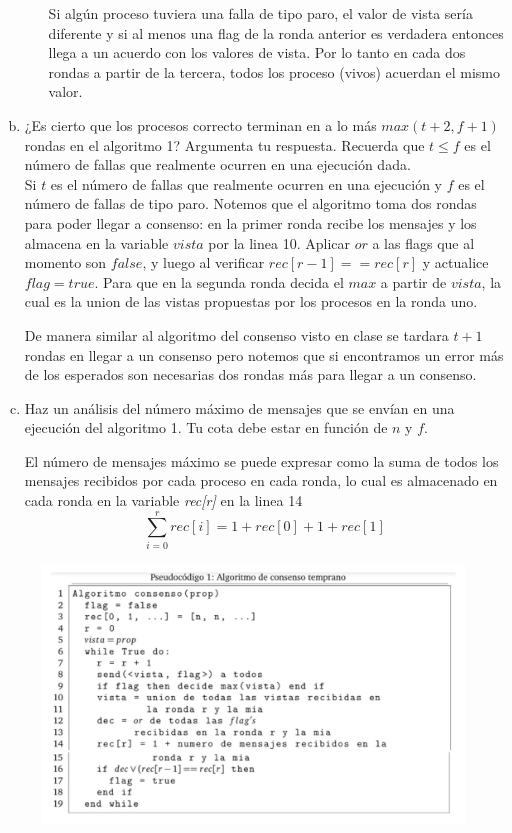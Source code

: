\begin{enumerate}[a)]
\begin{itemize}
        Si algún proceso tuviera una falla de tipo paro, el valor de vista sería
        diferente y si al menos una flag de la ronda anterior es verdadera entonces
        llega a un acuerdo con los valores de vista. Por lo tanto en cada dos
        rondas a partir de la tercera, todos los proceso (vivos) acuerdan el mismo valor.
    \end{itemize}


    \item ¿Es cierto que los procesos correcto terminan en a lo más
    $max(t +2, f +1)$ rondas en el algoritmo 1? Argumenta tu respuesta.
    Recuerda que $t \leq f$ es el número de fallas que realmente ocurren en una
    ejecución dada.\\
    Si $t$ es el número de fallas que realmente ocurren en una ejecución y $f$ es el número de fallas de tipo paro.
    Notemos que el algoritmo toma dos rondas para poder llegar a consenso: en la primer ronda recibe los mensajes y los almacena en la variable $vista$ por la linea 10. Aplicar $or$ a las flags que al momento son $false$, y luego al verificar $rec[r-1]==rec[r]$ y actualice $flag=true$. Para que en la segunda ronda decida el $max$ a partir de $vista$, la cual es la union de las vistas propuestas por los procesos en la ronda uno. 
    
    De manera similar al algoritmo del consenso visto en clase se tardara $t+1$ rondas en llegar a un consenso pero notemos que si encontramos un error más de los esperados son necesarias dos rondas más para llegar a un consenso.

    \item Haz un análisis del número máximo de mensajes que se envían en una
    ejecución del algoritmo 1. Tu cota debe estar en función de $n$ y $f$.

    El número de mensajes máximo se puede expresar como la suma de todos los mensajes recibidos por cada proceso en cada ronda, lo cual es almacenado en cada ronda en la variable \textit{rec[r]} en la linea 14
    \[\sum_{i=0}^r rec[i] = 1+rec[0]+1+rec[1]\]
\end{enumerate}

\begin{figure}
    \includegraphics[width=\textwidth]{consensoTemprano.png}
\end{figure}
